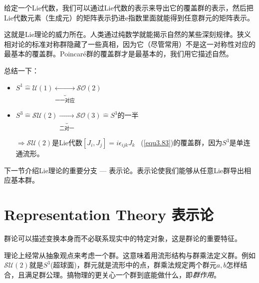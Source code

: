 给定一个Lie代数，我们可以通过Lie代数的表示来导出它的覆盖群的表示，然后把Lie代数元素（生成元）的矩阵表示扔进$\mathrm{e}$指数里面就能得到任意群元的矩阵表示。

这就是Lie理论的威力所在。人类通过纯数学就能揭示自然的某些深刻规律。狭义相对论的标准对称群隐藏了一些真相，因为它（尽管常用）不是这一对称性对应的最基本的覆盖群。Poincar\'e群的覆盖群才是最基本的，我们用它描述自然。

总结一下：

\begin{itemize}
	\item $S^1 \hat{=} \mathcal{U}(1) \underbrace{\longleftrightarrow}_{\text{一一对应}} \mathcal{SO}(2)$
	\item $S^3 \hat{=} \mathcal{SU}(2) \underbrace{\longrightarrow}_{\text{二对一}} \mathcal{SO}(3) \hat{=} S^3$的一半

		$\Rightarrow \mathcal{SU}(2)$是Lie代数$[J_i, J_j] = i\epsilon_{ijk} J_k$ \, (\eqref{equ3.83})的覆盖群，因为$S^3$是单连通流形。
\end{itemize}

下一节介绍Lie理论的重要分支 --- 表示论。表示论使我们能够从任意Lie群导出相应基本群。



\section[表示论]{Representation Theory 表示论}
\label{sec3.5}
群论可以描述变换本身而不必联系现实中的特定对象，这是群论的重要特征。

理论上经常从抽象观点来考虑一个群。这意味着用流形结构与群乘法定义群。例如$\mathcal{SU}(2)$就是$S^3$(超球面)，群元就是流形中的点，群乘法规定两个群元$a,b$怎样结合，且满足群公理。搞物理的更关心一个群到底能做什么，即{\it 群作用}。

